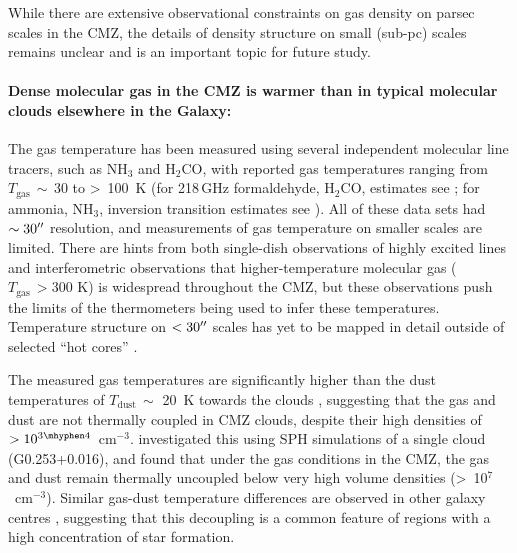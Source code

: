 While there are extensive observational constraints on gas density on parsec scales in the CMZ, the details of density structure on small (sub-pc) scales remains unclear and is an important topic for future study.

\paragraph{Dense molecular gas in the CMZ is warmer than in typical molecular clouds elsewhere in the Galaxy:}\label{subsubsec:tempstructure} 
The gas temperature has been measured using several independent molecular line tracers, such as NH$_{3}$ and H$_{2}$CO, with reported gas temperatures ranging from $T_\mathrm{gas}\,\sim$\,30 to \textgreater \ 100~K (for 218\,GHz formaldehyde, H$_{2}$CO, estimates see \citealp{Ao2013, Ginsburg2016, Immer2016}; for ammonia, NH$_{3}$, inversion transition estimates see \citealp{Krieger2017}).
All of these data sets had $\sim30\mbox{$^{\prime\prime}$}$ resolution, and measurements of gas temperature on smaller scales are limited.
There are hints from both single-dish observations of highly excited lines \citep{Mills2013} and interferometric observations \citep{Johnston2014} that higher-temperature molecular gas ($T_\mathrm{gas}\,>300$ K) is widespread throughout the CMZ, but these observations push the limits of the thermometers being used to infer these temperatures.  Temperature structure on $<30\mbox{$^{\prime\prime}$}$ scales has yet to be mapped in detail outside of selected ``hot cores'' \citep[e.g.][]{Sanchez-Monge2017,Bonfand2017, Walker2018, Walker2021}.

The measured gas temperatures are significantly higher than the dust temperatures of $T_\mathrm{dust}\,\sim$ 20~K towards the clouds \citep[e.g.][]{Marsh2016,Tang2021a}, suggesting that the gas and dust are not thermally coupled in CMZ clouds, despite their high densities of $>10^{3\mhyphen4}$~cm$^{-3}$.
\citet{Clark2013} investigated this using SPH simulations of a single cloud (G0.253+0.016), and found that under the gas conditions in the CMZ, the gas and dust remain thermally uncoupled below very high volume densities (\textgreater \ 10$^{7}$~cm$^{-3}$).
Similar gas-dust temperature differences are observed in other galaxy centres \citep[e.g., M83, NGC 253,][see Table \ref{tab:properties_overview}]{Mangum2013}, suggesting that this decoupling is a common feature of regions with a high concentration of star formation.

